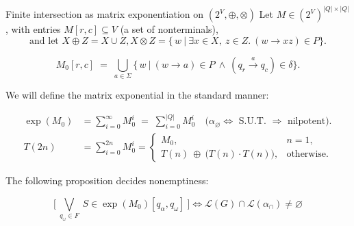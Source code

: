 \documentclass{beamer}
\begin{document}
\begin{frame}{Finite intersection as matrix exponentiation on $(2^V,\oplus,\otimes)$}
  Let $M \in (2^V)^{|Q|\times|Q|}$, with entries $M[r,c]\subseteq V$ (a set of nonterminals),
  \vspace{-0.35cm}
  \[
    \text{and let } X \oplus Z = X\cup Z ,
    X \otimes Z=\Big\{\, w \ \Big|\ \exists x\in X,\ z\in Z.\ (w\rightarrow xz)\in P \Big\}.
  \]

  \vspace{-0.25cm}
  \[
    M_0[r,c] \;=\; \bigcup_{a\in\Sigma}\Big\{\, w \ \Big|\ (w\rightarrow a)\in P \ \wedge\ (q_r \overset{a}{\rightarrow} q_c)\in\delta \Big\}.
  \]

  We will define the matrix exponential in the standard manner:

  \vspace{-0.35cm}
  \begin{align*}
    \exp(M_0)&=\sum_{i=0}^{\infty} M_0^i \;=\;\sum_{i=0}^{|Q|} M_0^i \quad\text{($\alpha_\varnothing \Leftrightarrow $ S.U.T. $\Rightarrow$ nilpotent).}\\
 T(2n)&=\sum_{i=0}^{2n}M_0^i = \begin{cases} M_0, & n=1,\\
      T(n)\ \oplus\ \big(T(n)\cdot T(n)\big), & \text{otherwise}.
    \end{cases}
  \end{align*}

  The following proposition decides nonemptiness:

  \[
    \Big[\ \bigvee_{q_\omega\in F}\ S\in \exp(M_0)[q_\alpha,q_\omega]\ \Big]  \Longleftrightarrow \mathcal{L}(G)\cap \mathcal{L}(\alpha_\cap) \neq \varnothing
  \]
\end{frame}
\end{document}
